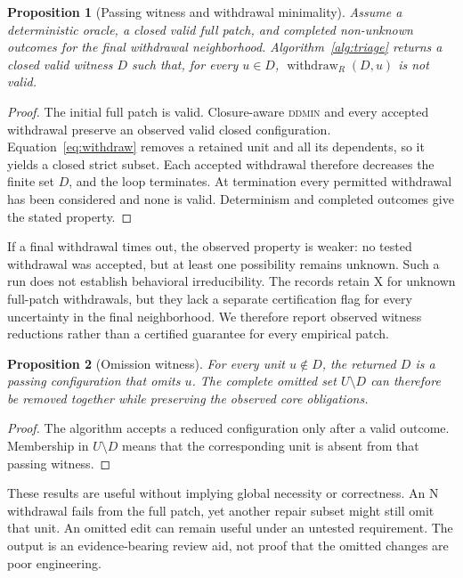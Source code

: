 \documentclass[a4paper,fleqn]{cas-sc}
\newcommand{\lab}[1]{\textsf{#1}}
\newcommand{\withdraw}{\operatorname{withdraw}}
\newtheorem{proposition}{Proposition}
\begin{document}
\begin{proposition}[Passing witness and withdrawal minimality]\label{prop:minimality}
Assume a deterministic oracle, a closed valid full patch, and completed non-unknown outcomes for the final withdrawal neighborhood. Algorithm~\ref{alg:triage} returns a closed valid witness $D$ such that, for every $u\in D$, $\withdraw_R(D,u)$ is not valid.
\end{proposition}
\begin{proof}
The initial full patch is valid. Closure-aware \textsc{ddmin} and every accepted withdrawal preserve an observed valid closed configuration. Equation~\ref{eq:withdraw} removes a retained unit and all its dependents, so it yields a closed strict subset. Each accepted withdrawal therefore decreases the finite set $D$, and the loop terminates. At termination every permitted withdrawal has been considered and none is valid. Determinism and completed outcomes give the stated property.
\end{proof}

If a final withdrawal times out, the observed property is weaker: no tested withdrawal was accepted, but at least one possibility remains unknown. Such a run does not establish behavioral irreducibility. The records retain \lab{X} for unknown full-patch withdrawals, but they lack a separate certification flag for every uncertainty in the final neighborhood. We therefore report observed witness reductions rather than a certified guarantee for every empirical patch.

\begin{proposition}[Omission witness]\label{prop:omission}
For every unit $u\notin D$, the returned $D$ is a passing configuration that omits $u$. The complete omitted set $U\setminus D$ can therefore be removed together while preserving the observed core obligations.
\end{proposition}
\begin{proof}
The algorithm accepts a reduced configuration only after a valid outcome. Membership in $U\setminus D$ means that the corresponding unit is absent from that passing witness.
\end{proof}

These results are useful without implying global necessity or correctness. An \lab{N} withdrawal fails from the full patch, yet another repair subset might still omit that unit. An omitted edit can remain useful under an untested requirement. The output is an evidence-bearing review aid, not proof that the omitted changes are poor engineering.
\end{document}
